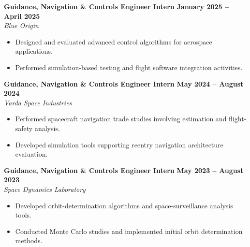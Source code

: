 \documentclass[10pt]{article}
\begin{document}
	\textbf{Guidance, Navigation \& Controls Engineer Intern} \hfill \textbf{January 2025 -- April 2025} \\
	\emph{Blue Origin}
	\begin{itemize}
		\item Designed and evaluated advanced control algorithms for aerospace applications.
		\item Performed simulation-based testing and flight software integration activities.
	\end{itemize}
	
	\textbf{Guidance, Navigation \& Controls Engineer Intern} \hfill \textbf{May 2024 -- August 2024} \\
	\emph{Varda Space Industries}
	\begin{itemize}
		\item Performed spacecraft navigation trade studies involving estimation and flight-safety analysis.
		\item Developed simulation tools supporting reentry navigation architecture evaluation.
	\end{itemize}
	
	\textbf{Guidance, Navigation \& Controls Engineer Intern} \hfill \textbf{May 2023 -- August 2023} \\
	\emph{Space Dynamics Laboratory}
	\begin{itemize}
		\item Developed orbit-determination algorithms and space-surveillance analysis tools.
		\item Conducted Monte Carlo studies and implemented initial orbit determination methods.
	\end{itemize}
	
\end{document}
